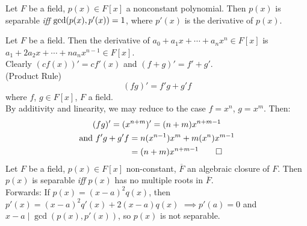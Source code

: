  Let $F$ be a field, $p(x)\in F[x]$ a nonconstant polynomial.  Then $p(x)$ is separable \emph{iff} $\gcd(p(x),\linebreak p'(x))=1$, where $p'(x)$ is the derivative of $p(x)$.

 Let $F$ be a field.  Then the derivative of $a_0+a_1x+\dotsb+a_nx^n\in F[x]$ is $a_1+2a_2x+\dotsb+na_nx^{n-1}\in F[x]$. \\
Clearly $(cf(x))'=cf'(x)$ and $(f+g)'=f'+g'$. \\
\thm (Product Rule)
\[ (fg)' = f' g + g' f \]
where $f$, $g\in F[x]$, $F$ a field. \\
\pf By additivity and linearity, we may reduce to the case $f=x^n$, $g=x^m$.  Then:
\begin{gather*}
(fg)' = (x^{n+m})' = (n+m)x^{n+m-1} \\
\begin{aligned}
\text{and } f' g + g' f &= n(x^{n-1})x^m + m(x^n)x^{m-1} \\
&= (n+m) x^{n+m-1} \qed
\end{aligned}
\end{gather*}
\thm Let $F$ be a field, $p(x)\in F[x]$ non-constant, $\overline F$ an algebraic closure of $F$.  Then $p(x)$ is separable \emph{iff} $p(x)$ has no multiple roots in $\overline F$. \\
\pf Forwards: If $p(x)=(x-a)^2q(x)$,
then $p'(x)=(x-a)^2q'(x)+2(x-a)q(x)$
$\implies p'(a)=0$
and $x-a\mid\gcd(p(x),p'(x))$, so $p(x)$ is not separable.
